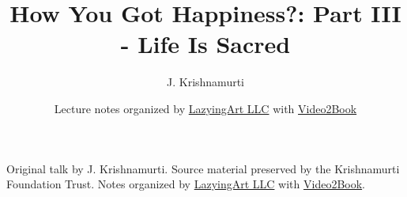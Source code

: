 \documentclass[11pt,oneside]{book}
\begin{document}
\frontmatter
\title{How You Got Happiness?: Part III - Life Is Sacred}
\author{J. Krishnamurti}
\date{Lecture notes organized by \href{https://lazying.art}{LazyingArt LLC} with \href{https://github.com/lachlanchen/Video2Book}{Video2Book}}
\maketitle
\begin{center}
\small Original talk by J. Krishnamurti. Source material preserved by the Krishnamurti Foundation Trust. Notes organized by \href{https://lazying.art}{LazyingArt LLC} with \href{https://github.com/lachlanchen/Video2Book}{Video2Book}.
\end{center}
\clearpage
\mainmatter

\end{document}
